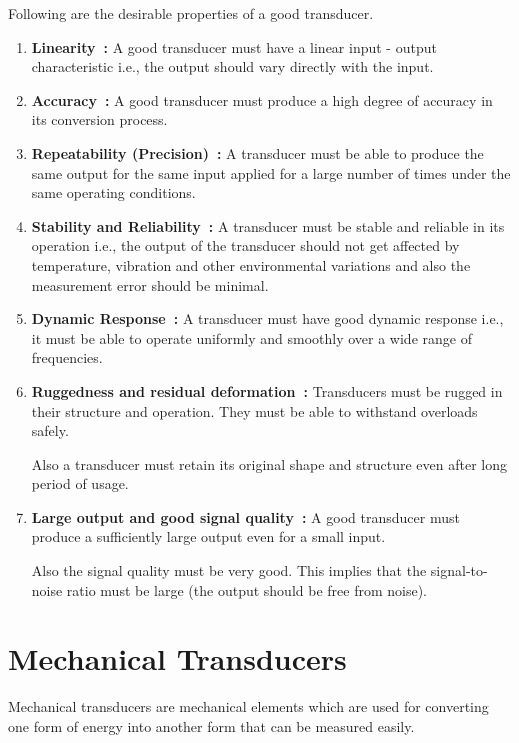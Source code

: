 Following are the desirable properties of a good transducer.
\begin{enumerate}
\renewcommand{\labelenumi}{\bf\theenumi.}
\item {\bf Linearity~:} A good transducer must have a linear input - output characteristic i.e., the output should vary directly with the input.

\item {\bf Accuracy~:} A good transducer must produce a high degree of accuracy in its conversion process.

\item {\bf Repeatability (Precision)~:} A transducer must be able to produce the same output for the same input applied for a large number of times under the same operating conditions.

\item {\bf Stability and Reliability~:} A transducer must be stable and reliable in its operation i.e., the output of the transducer should not get affected by temperature, vibration and other environmental variations and also the measurement error should be minimal.

\item {\bf Dynamic Response~:} A transducer must have good dynamic response i.e., it must be able to operate uniformly and smoothly over a wide range of frequencies.

\item {\bf Ruggedness and residual deformation~:} Transducers must be rugged in their structure and operation. They must be able to withstand overloads safely.

Also a transducer must retain its original shape and structure even after long period of usage.

\item {\bf Large output and good signal quality~:} A good transducer must produce a sufficiently large output even for a small input.

Also the signal quality must be very good. This implies that the signal-to-noise ratio must be large (the output should be free from noise). 
\end{enumerate}

\section{Mechanical Transducers}\label{sec8.5}

Mechanical transducers are mechanical elements which are used for converting one form of energy into another form that can be measured easily.

